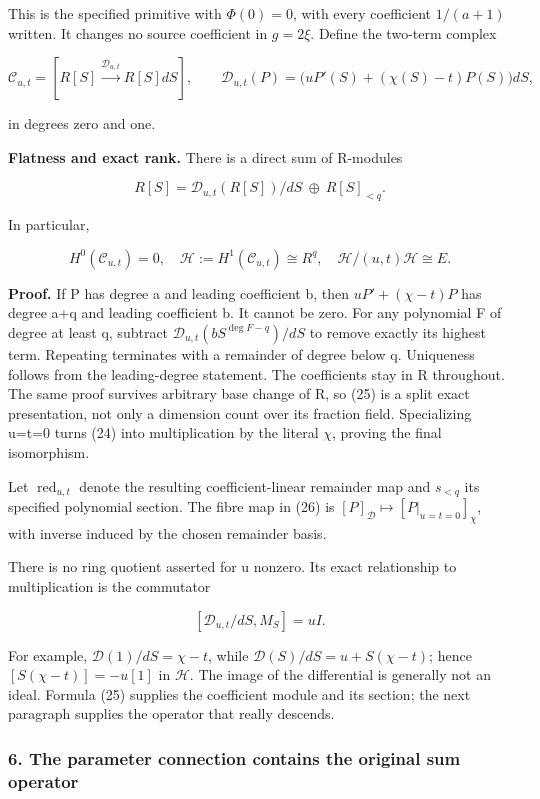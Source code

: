 This is the specified primitive with \(\Phi(0)=0\), with every coefficient \(1/(a+1)\) written. It changes no source coefficient in \(g=2\xi\). Define the two-term complex

\[
\mathcal C_{u,t}=[R[S]\xrightarrow{\mathcal D_{u,t}}R[S]dS],
\qquad
\mathcal D_{u,t}(P)=\bigl(uP'(S)+(\chi(S)-t)P(S)\bigr)dS,
\tag{24}
\]

in degrees zero and one.

\textbf{Flatness and exact rank.} There is a direct sum of R-modules

\[
\boxed{R[S]=\mathcal D_{u,t}(R[S])/dS\ \oplus\ R[S]_{<q}.}
\tag{25}
\]

In particular,

\[
\boxed{H^0(\mathcal C_{u,t})=0,\quad
\mathcal H:=H^1(\mathcal C_{u,t})\cong R^q,
\quad \mathcal H/(u,t)\mathcal H\cong E.}
\tag{26}
\]

\textbf{Proof.} If P has degree a and leading coefficient b, then \(uP'+(\chi-t)P\) has degree a+q and leading coefficient b. It cannot be zero. For any polynomial F of degree at least q, subtract \(\mathcal D_{u,t}(bS^{\deg F-q})/dS\) to remove exactly its highest term. Repeating terminates with a remainder of degree below q. Uniqueness follows from the leading-degree statement. The coefficients stay in R throughout. The same proof survives arbitrary base change of R, so (25) is a split exact presentation, not only a dimension count over its fraction field. Specializing u=t=0 turns (24) into multiplication by the literal \(\chi\), proving the final isomorphism.

Let \(\operatorname{red}_{u,t}\) denote the resulting coefficient-linear remainder map and \(s_{<q}\) its specified polynomial section. The fibre map in (26) is \([P]_{\mathcal D}\mapsto[P|_{u=t=0}]_\chi\), with inverse induced by the chosen remainder basis.

There is no ring quotient asserted for u nonzero. Its exact relationship to multiplication is the commutator

\[
[\mathcal D_{u,t}/dS,M_S]=uI.
\tag{27}
\]

For example, \(\mathcal D(1)/dS=\chi-t\), while \(\mathcal D(S)/dS=u+S(\chi-t)\); hence \([S(\chi-t)]=-u[1]\) in \(\mathcal H\). The image of the differential is generally not an ideal. Formula (25) supplies the coefficient module and its section; the next paragraph supplies the operator that really descends.

\subsubsection{6. The parameter connection contains the original sum operator}\label{endpoint-exponential_original--the-parameter-connection-contains-the-original-sum-operator}

